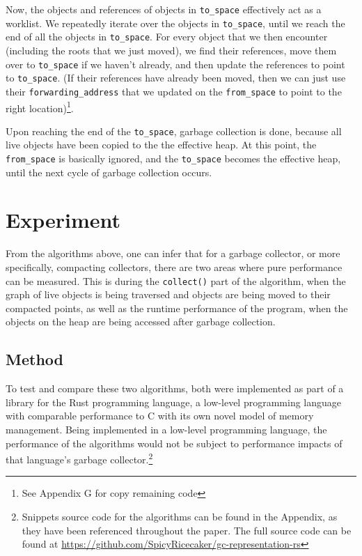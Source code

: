 \documentclass[index]{subfiles}
\begin{document}
Now, the objects and references of objects in \verb+to_space+ effectively act as a worklist. We repeatedly iterate over the objects in \verb+to_space+, until we reach the end of all the objects in \verb+to_space+. For every object that we then encounter (including the roots that we just moved), we find their references, move them over to \verb+to_space+ if we haven't already, and then update the references to point to \verb+to_space+. (If their references have already been moved, then we can just use their \verb+forwarding_address+ that we updated on the \verb+from_space+ to point to the right location)\footnote{See Appendix G for copy remaining code}.

Upon reaching the end of the \verb+to_space+, garbage collection is done, because all live objects have been copied to the the effective heap. At this point, the \verb+from_space+ is basically ignored, and the \verb+to_space+ becomes the effective heap, until the next cycle of garbage collection occurs.


\section{Experiment}

From the algorithms above, one can infer that for a garbage collector, or more specifically, compacting collectors, there are two areas where pure performance can be measured. This is during the \verb+collect()+ part of the algorithm, when the graph of live objects is being traversed and objects are being moved to their compacted points, as well as the runtime performance of the program, when the objects on the heap are being accessed after garbage collection.

\subsection{Method}

To test and compare these two algorithms, both were implemented as part of a library for the Rust programming language, a low-level programming language with comparable performance to C with its own novel model of memory management. Being implemented in a low-level programming language, the performance of the algorithms would not be subject to performance impacts of that language's garbage collector.\footnote{Snippets source code for the algorithms can be found in the Appendix, as they have been referenced throughout the paper. The full source code can be found at \href{https://github.com/SpicyRicecaker/gc-representation-rs}{https://github.com/SpicyRicecaker/gc-representation-rs}}
\end{document}
